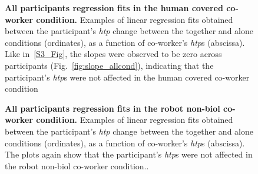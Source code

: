 \begin{figure}[hpt]
	\caption{{\bf All participants regression fits in the human covered co-worker condition.} Examples of linear regression fits obtained between the participant's {\it htp} change between the together and alone conditions (ordinates), as a function of co-worker's {\it htp}s (abscissa). Like in~\ref{S3_Fig}, the slopes were observed to be zero across participants (Fig.~\ref{fig:slope_allcond}), indicating that  the participant's {\it htp}s were not affected in the human covered co-worker condition}
\label{S4_Fig}
\end{figure}


\begin{figure}
	\caption{{\bf All participants regression fits in the robot non-biol co-worker condition.} Examples of linear regression fits obtained between the participant's {\it htp} change between the together and alone conditions (ordinates), as a function of co-worker's {\it htp}s (abscissa). The plots again show that the participant's {\it htp}s were not affected in the robot non-biol co-worker condition..}
\label{S5_Fig}
\end{figure}


